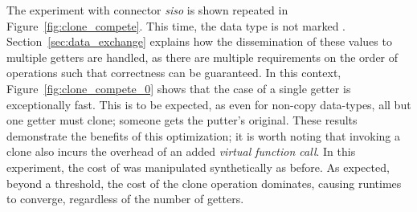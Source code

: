 The experiment with connector \textit{siso} is shown repeated in Figure~\ref{fig:clone_compete}. This time, the data type is not marked . Section~\ref{sec:data_exchange} explains how the dissemination of these values to multiple getters are handled, as there are multiple requirements on the order of operations such that correctness can be guaranteed. In this context, Figure~\ref{fig:clone_compete_0} shows that the case of a single getter is exceptionally fast. This is to be expected, as even for non-copy data-types, all but one getter must clone; someone gets the putter's original. These results demonstrate the benefits of this optimization; it is worth noting that invoking a clone also incurs the overhead of an added \textit{virtual function call}.
In this experiment, the cost of  was manipulated synthetically as before. As expected, beyond a threshold, the cost of the clone operation dominates, causing runtimes to converge, regardless of the number of getters.



